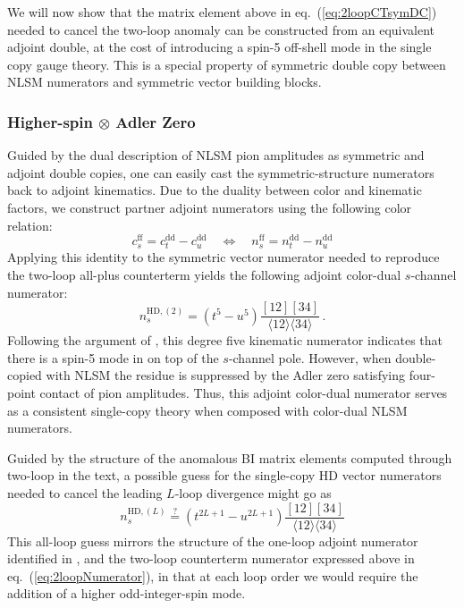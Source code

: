 \documentclass[11pt,letter]{article}
\def\eqn#1{eq.~(\ref{#1})}
\begin{document}
We will now show that the matrix element above in \eqn{eq:2loopCTsymDC} needed to cancel the two-loop anomaly can be constructed from an equivalent adjoint double, at the cost of introducing a spin-5 off-shell mode in the single copy gauge theory. This is a special property of symmetric double copy between NLSM numerators and symmetric vector building blocks. 

\subsubsection{Higher-spin $\otimes$ Adler Zero}\label{sec:HspinDC}
Guided by the dual description of NLSM pion amplitudes as symmetric {and} adjoint double copies, one can easily cast the symmetric-structure numerators back to adjoint kinematics. Due to the duality between color and kinematic factors, we construct partner adjoint numerators using the following color relation:
\begin{equation}
c_s^{\text{ff}} = c_t^{\text{dd}}-c_u^{\text{dd}} \quad \Leftrightarrow \quad n_s^{\text{ff}} = n_t^{\text{dd}}-n_u^{\text{dd}} 
\end{equation}
Applying this identity to the symmetric vector numerator needed to reproduce the two-loop all-plus counterterm yields the following adjoint color-dual $s$-channel numerator:
\begin{equation}\label{eq:2loopNumerator}
n^{\text{HD},(2)}_s = (t^{5}-u^{5})\frac{[12][34]}{\langle 12\rangle \langle 34\rangle}\,.
\end{equation}
Following the argument of \cite{Pavao:2022kog}, this degree five kinematic numerator indicates that there is a spin-5 mode in on top of the $s$-channel pole. However, when double-copied with NLSM the residue is suppressed by the Adler zero satisfying four-point contact of pion amplitudes. Thus, this adjoint color-dual numerator serves as a consistent single-copy theory when composed with color-dual NLSM numerators. 

Guided by the structure of the anomalous BI matrix elements computed through two-loop in the text, a possible guess for the single-copy HD vector numerators needed to cancel the leading $L$-loop divergence might go as
\begin{equation}
n^{\text{HD},(L)}_s \stackrel{?}{=} (t^{2L+1}-u^{2L+1})\frac{[12][34]}{\langle 12\rangle \langle 34\rangle}
\end{equation}
This all-loop guess mirrors the structure of the one-loop adjoint numerator identified in \cite{Carrasco:2022jxn}, and the two-loop counterterm numerator expressed above in \eqn{eq:2loopNumerator}, in that at each loop order we would require the addition of a higher odd-integer-spin mode. 
\end{document}
